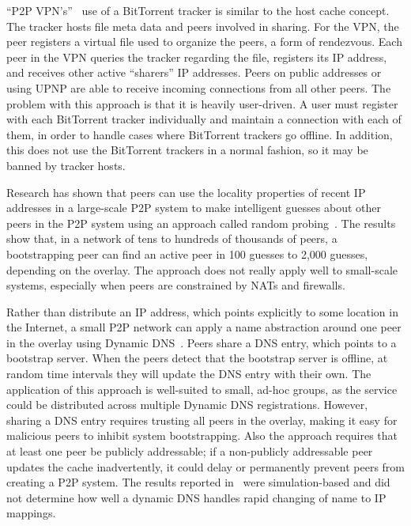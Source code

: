 ``P2P VPN's''~\cite{p2pvpn} use of a BitTorrent tracker is similar to the host
cache concept.  The tracker hosts file meta data and peers involved in sharing.
For the VPN, the peer registers a virtual file used to organize the peers, a
form of rendezvous.  Each peer in the VPN queries the tracker regarding the
file, registers its IP address, and receives other active ``sharers'' IP
addresses.  Peers on public addresses or using UPNP are able to receive
incoming connections from all other peers.  The problem with this approach is
that it is heavily user-driven.  A user must register with each BitTorrent
tracker individually and maintain a connection with each of them, in order to
handle cases where BitTorrent trackers go offline.  In addition, this does not
use the BitTorrent trackers in a normal fashion, so it may be banned by tracker
hosts.

Research has shown that peers can use the locality properties of recent IP
addresses in a large-scale P2P system to make intelligent guesses about other
peers in the P2P system using an approach called random
probing~\cite{bootstrapping_p2p, locality_aware}.  The results show that, in a
network of tens to hundreds of thousands of peers, a bootstrapping peer can
find an active peer in 100 guesses to 2,000 guesses, depending on the overlay.
The approach does not really apply well to small-scale systems, especially when
peers are constrained by NATs and firewalls.

Rather than distribute an IP address, which points explicitly to some location
in the Internet, a small P2P network can apply a name abstraction around one
peer in the overlay using Dynamic DNS~\cite{bootstrapping_ddns}.  Peers share a
DNS entry, which points to a bootstrap server.  When the peers detect that the
bootstrap server is offline, at random time intervals they will update the DNS
entry with their own.  The application of this approach is well-suited to
small, ad-hoc groups, as the service could be distributed across multiple
Dynamic DNS registrations.  However, sharing a DNS entry requires trusting all
peers in the overlay, making it easy for malicious peers to inhibit system
bootstrapping.  Also the approach requires that at least one peer be publicly
addressable; if a non-publicly addressable peer updates the cache
inadvertently, it could delay or permanently prevent peers from creating a P2P
system.  The results reported in~\cite{bootstrapping_ddns} were
simulation-based and did not determine how well a dynamic DNS handles rapid
changing of name to IP mappings.

